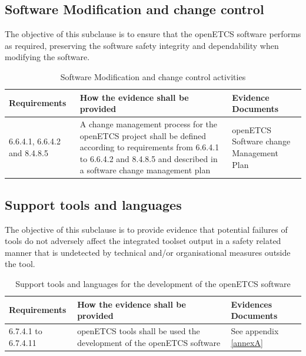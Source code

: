 \documentclass{template/openetcs_report}
\begin{document}
\subsection{Software Modification and change control}
\begin{flushleft}
The objective of this subclause is to ensure that the openETCS software performs as required, preserving the software safety integrity and dependability when modifying the software.
\end{flushleft}
{\footnotesize\sffamily\centering
\begin{longtable}{|p{2cm}|p{9cm}|p{3cm}|}
\caption{Software Modification and change control activities}\\
\hline
\bfseries Requirements & \bfseries How the evidence shall be provided & \bfseries Evidence Documents\\
\hline
\hline
\endhead
\hline
\endfoot

6.6.4.1, 6.6.4.2 and 8.4.8.5 & A change management process for the openETCS project shall be defined according to requirements from 6.6.4.1 to 6.6.4.2 and 8.4.8.5 and described in a  software change management plan 
& openETCS Software change Management Plan\\ 
\hline
\end{longtable}}


\subsection{Support tools and languages}
\begin{flushleft}
The objective of this subclause is to provide evidence that potential failures of tools do not adversely affect the integrated toolset output in a safety related manner that is undetected by technical and/or organisational measures outside the tool.
\end{flushleft}
{\footnotesize\sffamily\centering
\begin{longtable}{|p{2cm}|p{9cm}|p{3cm}|}
\caption{Support tools and languages for the development of the openETCS software}\\
\hline
\bfseries Requirements & \bfseries How the evidence shall be provided & \bfseries Evidences Documents\\
\hline
\hline
\endhead
\hline
\endfoot

6.7.4.1 to 6.7.4.11 & openETCS tools shall be used the development of the openETCS software & See appendix \ref{annexA}\\ 
\hline
\end{longtable}}
\end{document}
